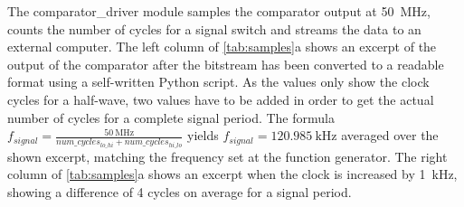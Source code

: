 \documentclass[
	english,
	ruledheaders=section, %
	class=report,%
	thesis={type=Project Seminar Report},%
	accentcolor=TUDa-1d, %
	custommargins=false,%
	marginpar=false,%
	parskip=half-,%
	fontsize=11pt,%
]{tudapub}
\begin{document}
\begin{table}
\centering
{}
\caption{Sampling excerpts}
\label{tab:samples}
\vspace{-15pt}
\end{table}

The comparator\_driver module samples the comparator output at \SI{50}{\mega\hertz}, counts the number of cycles for a signal switch and streams the data to an external computer. The left column of \cref{tab:samples}a shows an excerpt of the output of the comparator after the bitstream has been converted to a readable format using a self-written Python script. As the values only show the clock cycles for a half-wave, two values have to be added in order to get the actual number of cycles for a complete signal period. The formula $f_{signal}=\frac{\SI{50}{\mega\hertz}}{num\_cycles_{lo\_hi} + num\_cycles_{hi\_lo}}$ yields $f_{signal}=\SI{120.985}{\kilo\hertz}$ averaged over the shown excerpt, matching the frequency set at the function generator. The right column of \cref{tab:samples}a shows an excerpt when the clock is increased by \SI{1}{\kilo\hertz}, showing a difference of 4 cycles on average for a signal period.
\end{document}
